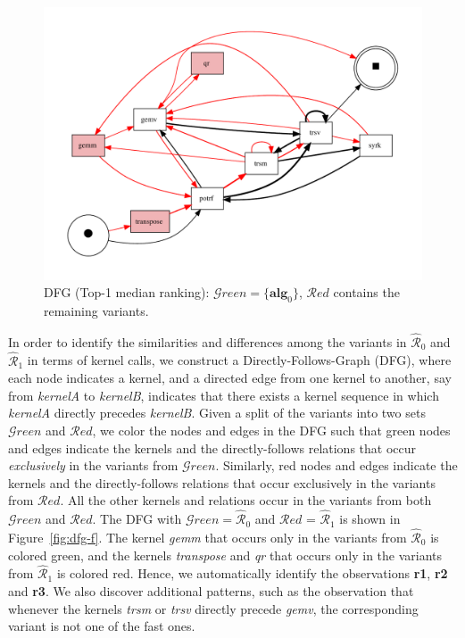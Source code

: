 \documentclass[acmsmall,screen, review]{acmart}
\begin{document}
\begin{figure}[h!]
	\centering
	\includegraphics[width=.7\linewidth]{fig/ch3/gls-median}
	\caption{DFG (Top-1 median ranking):  $\mathcal{G}reen = \{ \mathbf{alg}_0\}$, $\mathcal{R}ed$ contains the remaining variants.}
	\label{fig3:dfg-m1}
\end{figure}



In order to identify the similarities and differences among the variants in $\mathcal{\hat{R}}_0$ and $\mathcal{\hat{R}}_1$ in terms of kernel calls, we construct a Directly-Follows-Graph (DFG), where each node indicates a kernel, and a directed edge from one kernel to another, say from \textit{kernelA} to \textit{kernelB}, indicates that there exists a kernel sequence in which \textit{kernelA} directly precedes \textit{kernelB}. Given a split of the variants into two sets $\mathcal{G}reen$ and $\mathcal{R}ed$, we color the nodes and edges in the DFG such that green nodes and edges indicate the kernels and the directly-follows relations that occur \textit{exclusively} in the variants from $\mathcal{G}reen$. Similarly, red nodes and edges indicate the kernels and the directly-follows relations that occur exclusively in the variants from $\mathcal{R}ed$. All the other kernels and relations occur in the variants from both $\mathcal{G}reen$ and $\mathcal{R}ed$. The DFG with $\mathcal{G}reen = \hat{\mathcal{R}}_0$ and  $\mathcal{R}ed$ = $\mathcal{\hat{R}}_1$ is shown in Figure~\ref{fig:dfg-f}. The kernel \textit{gemm} that occurs only in the variants from $\hat{\mathcal{R}}_0$ is colored green, and the kernels \textit{transpose} and \textit{qr} that occurs only in the variants from $\hat{\mathcal{R}}_1$ is colored red. Hence, we automatically identify the observations \textbf{r1}, \textbf{r2} and \textbf{r3}. We also discover additional patterns, such as the observation that whenever the kernels \textit{trsm} or \textit{trsv} directly precede \textit{gemv}, the corresponding variant is not one of the fast ones.
\end{document}
